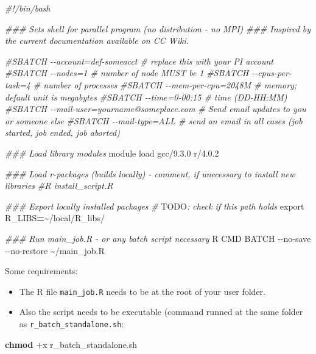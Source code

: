 \documentclass[
]{book}
\newenvironment{Shaded}{\begin{snugshade}}{\end{snugshade}}
\newcommand{\AlertTok}[1]{\textcolor[rgb]{0.94,0.16,0.16}{#1}}
\newcommand{\AttributeTok}[1]{\textcolor[rgb]{0.13,0.29,0.53}{#1}}
\newcommand{\BuiltInTok}[1]{#1}
\newcommand{\CommentTok}[1]{\textcolor[rgb]{0.56,0.35,0.01}{\textit{#1}}}
\newcommand{\ExtensionTok}[1]{#1}
\newcommand{\FunctionTok}[1]{\textcolor[rgb]{0.13,0.29,0.53}{\textbf{#1}}}
\newcommand{\NormalTok}[1]{#1}
\newcommand{\OperatorTok}[1]{\textcolor[rgb]{0.81,0.36,0.00}{\textbf{#1}}}
\newcommand{\VariableTok}[1]{\textcolor[rgb]{0.00,0.00,0.00}{#1}}
\providecommand{\tightlist}{%
  \setlength{\itemsep}{0pt}\setlength{\parskip}{0pt}}
\begin{document}
\begin{Shaded}
\begin{Highlighting}[]
\CommentTok{\#!/bin/bash}

\CommentTok{\#\#\# Sets shell for parallel program (no distribution {-} no MPI)}
\CommentTok{\#\#\# Inspired by the current documentation available on CC Wiki.}

\CommentTok{\#SBATCH {-}{-}account=def{-}someacct             \# replace this with your PI account}
\CommentTok{\#SBATCH {-}{-}nodes=1                          \# number of node MUST be 1}
\CommentTok{\#SBATCH {-}{-}cpus{-}per{-}task=4                  \# number of processes}
\CommentTok{\#SBATCH {-}{-}mem{-}per{-}cpu=2048M                \# memory; default unit is megabytes}
\CommentTok{\#SBATCH {-}{-}time=0{-}00:15                     \# time (DD{-}HH:MM)}
\CommentTok{\#SBATCH {-}{-}mail{-}user=yourname@someplace.com \# Send email updates to you or someone else}
\CommentTok{\#SBATCH {-}{-}mail{-}type=ALL                    \# send an email in all cases (job started, job ended, job aborted)}

\CommentTok{\#\#\# Load library modules}
\ExtensionTok{module}\NormalTok{ load gcc/9.3.0 r/4.0.2}

\CommentTok{\#\#\# Load r{-}packages (builds locally) {-} comment, if unecessary to install new libraries}
\CommentTok{\#R install\_script.R}

\CommentTok{\#\#\# Export locally installed packages}
\CommentTok{\# }\AlertTok{TODO}\CommentTok{: check if this path holds}
\BuiltInTok{export} \VariableTok{R\_LIBS}\OperatorTok{=}\NormalTok{\textasciitilde{}/local/R\_libs/}

\CommentTok{\#\#\# Run main\_job.R {-} or any batch script necessary}
\ExtensionTok{R}\NormalTok{ CMD BATCH }\AttributeTok{{-}{-}no{-}save} \AttributeTok{{-}{-}no{-}restore}\NormalTok{ \textasciitilde{}/main\_job.R}
\end{Highlighting}
\end{Shaded}

Some requirements:

\begin{itemize}
\tightlist
\item
  The R file \texttt{main\_job.R} needs to be at the root of your user folder.
\item
  Also the script needs to be executable (command runned at the same folder
  as \texttt{r\_batch\_standalone.sh}:
\end{itemize}

\begin{Shaded}
\begin{Highlighting}[]
\FunctionTok{chmod}\NormalTok{ +x r\_batch\_standalone.sh}
\end{Highlighting}
\end{Shaded}
\end{document}
